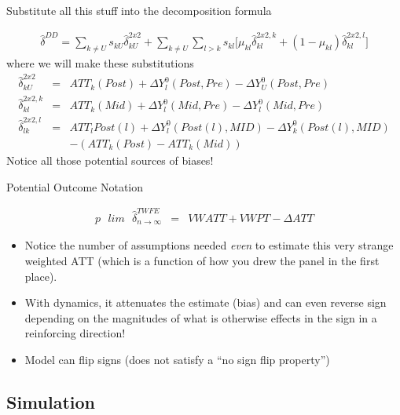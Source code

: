 \documentclass{beamer}
\begin{document}
\begin{frame}{Substitute all this stuff into the decomposition formula}

\begin{eqnarray*}	
\widehat{\delta}^{DD} = \sum_{k \neq U} s_{kU}\widehat{\delta}_{kU}^{2x2} + \sum_{k \neq U} \sum_{l>k} s_{kl}  \bigg [ \mu_{kl}\widehat{\delta}_{kl}^{2x2,k} + (1-\mu_{kl}) \widehat{\delta}_{kl}^{2x2,l} \bigg]
\end{eqnarray*}where we will make these substitutions\begin{eqnarray*}
\widehat{\delta}_{kU}^{2x2} &=& ATT_k(Post) + \Delta Y_l^0(Post,Pre) - \Delta Y_U^0(Post, Pre) \\
\widehat{\delta}_{kl}^{2x2,k} &=& ATT_k(Mid) + \Delta Y_l^0(Mid,Pre) - \Delta Y_l^0(Mid, Pre) \\
\widehat{\delta}^{2x2,l}_{lk} &=& ATT_{l}Post(l) + \Delta Y^0_l(Post(l),MID) - \Delta Y^0_k ( Post(l), MID) \\
&&- (ATT_k(Post) - ATT_k(Mid))
\end{eqnarray*}Notice all those potential sources of biases! 

\end{frame}


\begin{frame}{Potential Outcome Notation}

\begin{eqnarray*}
p\text{ }lim\text{ } \widehat{\delta}^{TWFE}_{n\to\infty} &=& VWATT + VWPT - \Delta ATT
\end{eqnarray*}

\begin{itemize}
\item Notice the number of assumptions needed \emph{even} to estimate this very strange weighted ATT (which is a function of how you drew the panel in the first place). 
\item With dynamics, it attenuates the estimate (bias) and can even reverse sign depending on the magnitudes of what is otherwise effects in the sign in a reinforcing direction! 
\item Model can flip signs (does not satisfy a ``no sign flip property'')
\end{itemize}

\end{frame}



\subsection{Simulation}
\end{document}
